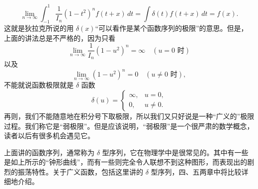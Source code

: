 \[
\lim_{n\to\infty}\int_{-1}^1\frac1{I_n}(1-t^2)^n f(t+x)\,dt
=\int\delta(t)f(t+x)\,dt=f(x).
\]
这就是狄拉克所说的用 $\delta(x)$“可以看作是某个函数序列的极限”的意思。但是，上面的讲法总是不严格的，因为只看
\[
\lim_{n\to\infty}\frac1{I_n}(1-u^2)^n=\infty\quad(u=0\text{ 时})
\]
以及
\[
\lim_{n\to\infty}(1-u^2)^n=0\quad(u\ne0\text{ 时}),
\]
不能就说函数极限就是 $\delta$ 函数
\[
\delta(u)=
\begin{cases}
\infty, & u=0,\\
0, & u\ne0.
\end{cases}
\]
再则，我们不能随意地在积分号下取极限，所以我们又只好说是一种“广义的”极限过程。我们称它是“弱极限”。但是应该说明，“弱极限”是一个很严肃的数学概念，读者以后有很多机会遇见它。

上面讲的函数序列，通常称为 $\delta$ 型序列，它在物理学中是很常见的。其中有一些是如上所示的“钟形曲线”，而有一些则完全令人联想不到这种图形，而表现出的剧烈的振荡特性。关于广义函数，包括这里讲的 $\delta$ 型序列，四、五两章中将比较详细地介绍。
